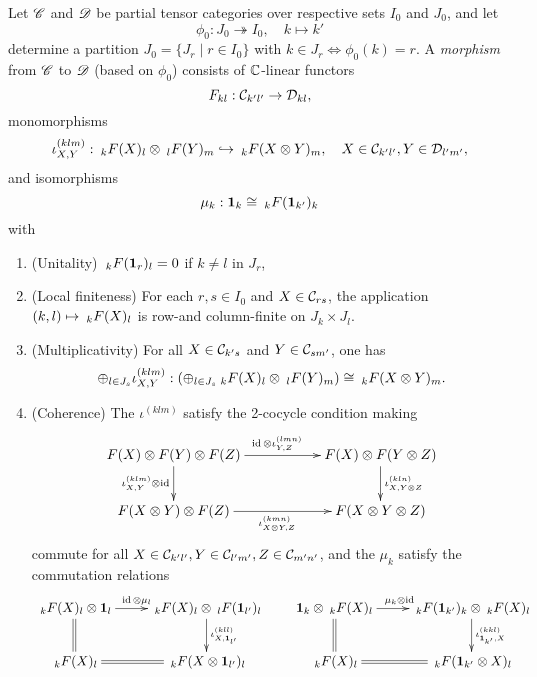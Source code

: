 \begin{Def} Let $\CatCC$ and $\CatDD$ be partial tensor categories over respective sets $I_0$ and $J_0$, and let \[\phi_0:J_0\twoheadrightarrow I_0,\quad k\mapsto k'\] determine a partition $J_0 = \{J_r\mid r\in I_0\}$ with $k\in J_r \iff \phi_0(k)=r$. 
A \emph{morphism} from $\CatCC$ to $\CatDD$ (based on $\phi_0$) consists of $\C$-linear functors \[F_{kl}: \CatC_{k'l'}\rightarrow \CatD_{kl},\] monomorphisms \[\iota^{(klm)}_{X,Y}: \GrDA{F(X)}{k}{l} \otimes \GrDA{F(Y)}{l}{m} \hookrightarrow \GrDA{F(X\otimes Y)}{k}{m}, \quad X\in \CatC_{k'l'},Y\in \CatD_{l'm'},\] and isomorphisms \[\mu_{k}:  \Unit_k \cong \GrDA{F(\Unit_{k'})}{k}{k}\] with \begin{enumerate}[label=(\alph*)]
\item (Unitality)  $\GrDA{F(\Unit_{r})}{k}{l}= 0$ if $k\neq l$ in $J_r$,
\item (Local finiteness) For each $r,s\in I_0$ and $X\in \CatC_{rs}$, the application $(k,l)\mapsto \GrDA{F(X)}{k}{l}$ is row-and column-finite on $J_k\times J_l$. 
\item (Multiplicativity) For all $X\in \CatC_{k's}$ and $Y\in \CatC_{sm'}$, one has\[\oplus_{l\in J_s} \iota^{(klm)}_{X,Y}: \left(\oplus_{l\in J_s} \GrDA{F(X)}{k}{l} \otimes \GrDA{F(Y)}{l}{m}\right) \cong \GrDA{F(X\otimes Y)}{k}{m}.\]
\item (Coherence) %
The $\iota^{(klm)}$ satisfy the 2-cocycle condition making \[\xymatrix{F(X)\otimes F(Y)\otimes F(Z) \ar[rr]^{\id\otimes \iota^{(lmn)}_{Y,Z}} \ar[d]_{\iota^{(klm)}_{X,Y}\otimes\id}&& F(X)\otimes F(Y\otimes Z)\ar[d]^{\iota^{(kln)}_{X,Y\otimes Z}}\\ F(X\otimes Y)\otimes F(Z) \ar[rr]_{\iota^{(kmn)}_{X\otimes Y,Z}}&& F(X\otimes Y \otimes Z)}\] commute for all $X\in \CatC_{k'l'},Y\in \CatC_{l'm'}, Z\in \CatC_{m'n'}$, and the $\mu_k$ satisfy the commutation relations \[\xymatrix{ \GrDA{F(X)}{k}{l}\otimes \Unit_l \ar[r]^{\!\!\!\!\id\otimes \mu_l} \ar@{=}[d] & \GrDA{F(X)}{k}{l} \otimes \GrDA{F(\Unit_{l'})}{l}{l} \ar[d]^{\iota^{(kll)}_{X, \Unit_{l'}}} \\ \GrDA{F(X)}{k}{l} & \ar@{=}[l] \GrDA{F(X\otimes \Unit_{l'})}{k}{l}} \qquad \xymatrix{  \Unit_k\otimes \GrDA{F(X)}{k}{l}\ar[r]^{\!\!\!\!\mu_k\otimes \id} \ar@{=}[d] & \GrDA{F(\Unit_{k'})}{k}{k} \otimes \GrDA{F(X)}{k}{l} \ar[d]^{\iota^{(kkl)}_{\Unit_{k'},X}} \\ \GrDA{F(X)}{k}{l} & \ar@{=}[l] \GrDA{ F(\Unit_{k'}\otimes X)}{k}{l}} \]
\end{enumerate}
\end{Def}

